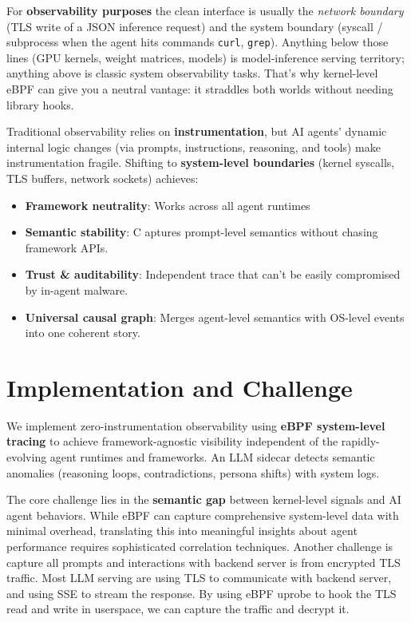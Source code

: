 \documentclass[sigplan,screen，review,9pt]{acmart}
\begin{document}
For \textbf{observability purposes} the clean interface is usually the \emph{network boundary} (TLS write of a JSON inference request) and the system boundary (syscall / subprocess when the agent hits commands \verb|curl|, \verb|grep|).  Anything below those lines (GPU kernels, weight matrices, models) is model-inference serving territory; anything above is classic system observability tasks.  That’s why kernel-level eBPF can give you a neutral vantage: it straddles both worlds without needing library hooks.

Traditional observability relies on \textbf{instrumentation}, but AI agents' dynamic internal logic changes (via prompts, instructions, reasoning, and tools) make instrumentation fragile. Shifting to \textbf{system-level boundaries} (kernel syscalls, TLS buffers, network sockets) achieves: 
\begin{itemize}
  \item \textbf{Framework neutrality}: Works across all agent runtimes 
  \item \textbf{Semantic stability}: C aptures prompt-level semantics without chasing framework APIs.
  \item \textbf{Trust \& auditability}: Independent trace that can’t be easily compromised by in-agent malware.
  \item \textbf{Universal causal graph}: Merges agent-level semantics with OS-level events into one coherent story.
\end{itemize}


\section{Implementation and Challenge}

We implement zero-instrumentation observability using \textbf{eBPF system-level tracing} to achieve framework-agnostic visibility  independent of the rapidly-evolving agent runtimes and frameworks. An LLM sidecar detects semantic anomalies (reasoning loops, contradictions, persona shifts) with system logs.

The core challenge lies in the \textbf{semantic gap} between kernel-level signals and AI agent behaviors. While eBPF can capture comprehensive system-level data with minimal overhead, translating this into meaningful insights about agent performance requires sophisticated correlation techniques.
Another challenge is capture all prompts and interactions with backend server is from encrypted TLS traffic. Most LLM serving are using TLS to communicate with backend server, and using SSE to stream the response. By using eBPF uprobe to hook the TLS read and write in userspace, we can capture the traffic and decrypt it.
\end{document}
